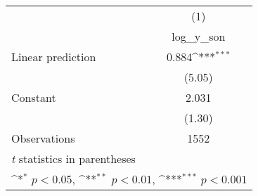 {
\def\sym#1{\ifmmode^{#1}\else\(^{#1}\)\fi}
\begin{tabular}{l*{1}{c}}
\hline\hline
                    &\multicolumn{1}{c}{(1)}\\
                    &\multicolumn{1}{c}{log\_y\_son}\\
\hline
Linear prediction   &       0.884\sym{***}\\
                    &      (5.05)         \\
[1em]
Constant            &       2.031         \\
                    &      (1.30)         \\
\hline
Observations        &        1552         \\
\hline\hline
\multicolumn{2}{l}{\footnotesize \textit{t} statistics in parentheses}\\
\multicolumn{2}{l}{\footnotesize \sym{*} \(p<0.05\), \sym{**} \(p<0.01\), \sym{***} \(p<0.001\)}\\
\end{tabular}
}
